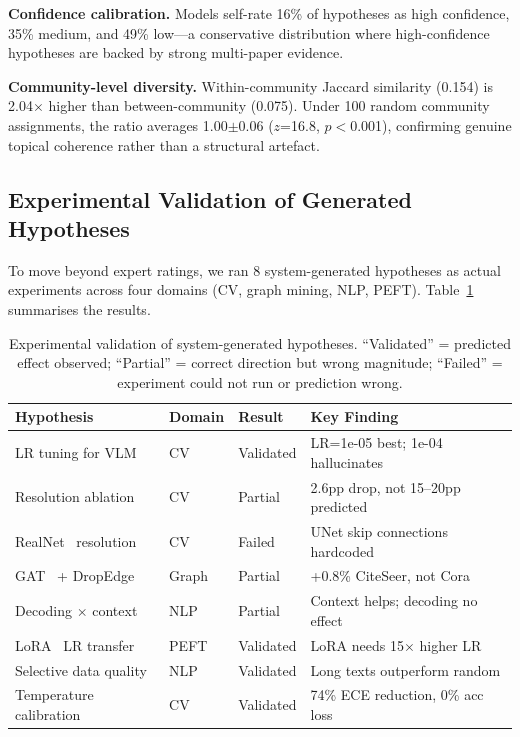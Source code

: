 \documentclass[conference]{IEEEtran}
\begin{document}
\textbf{Confidence calibration.}
Models self-rate 16\% of hypotheses as high confidence, 35\% medium, and 49\% low---a conservative distribution where high-confidence hypotheses are backed by strong multi-paper evidence.

\textbf{Community-level diversity.}
Within-community Jaccard similarity (0.154) is 2.04$\times$ higher than between-community (0.075).
Under 100 random community assignments, the ratio averages 1.00$\pm$0.06 ($z$=16.8, $p<$0.001), confirming genuine topical coherence rather than a structural artefact.


\subsection{Experimental Validation of Generated Hypotheses}

To move beyond expert ratings, we ran 8 system-generated hypotheses as actual experiments across four domains (CV, graph mining, NLP, PEFT).
Table~\ref{tab:validation} summarises the results.

\begin{table}[t]
\caption{Experimental validation of system-generated hypotheses. ``Validated'' = predicted effect observed; ``Partial'' = correct direction but wrong magnitude; ``Failed'' = experiment could not run or prediction wrong.}
\label{tab:validation}
\centering
\scriptsize
\begin{tabular}{llll}
\toprule
\textbf{Hypothesis} & \textbf{Domain} & \textbf{Result} & \textbf{Key Finding} \\
\midrule
LR tuning for VLM & CV & Validated & LR=1e-05 best; 1e-04 hallucinates \\
Resolution ablation & CV & Partial & 2.6pp drop, not 15--20pp predicted \\
RealNet~\cite{zhang2024realnet} resolution & CV & Failed & UNet skip connections hardcoded \\
GAT~\cite{velickovic2018gat} + DropEdge~\cite{rong2020dropedge} & Graph & Partial & +0.8\% CiteSeer, not Cora \\
Decoding $\times$ context & NLP & Partial & Context helps; decoding no effect \\
LoRA~\cite{hu2022lora} LR transfer & PEFT & Validated & LoRA needs 15$\times$ higher LR \\
Selective data quality & NLP & Validated & Long texts outperform random \\
Temperature calibration & CV & Validated & 74\% ECE reduction, 0\% acc loss \\
\bottomrule
\end{tabular}
\end{table}
\end{document}

